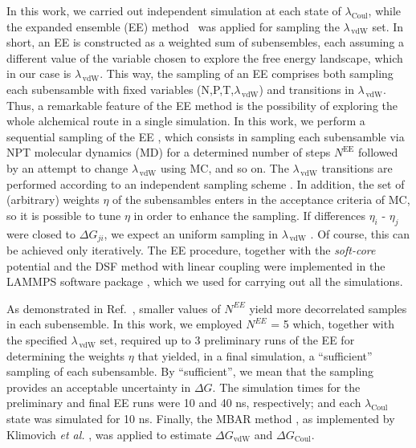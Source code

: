 \documentclass[3p,twocolumn]{elsarticle}
\begin{document}
In this work, we carried out independent simulation at each state of $\lambda_{\text{Coul}}$, while the expanded ensemble (EE) method~\cite{Lyubartsev_1992} was applied for sampling the $\lambda_{\,\text{vdW}}$ set.
In short, an EE is constructed as a weighted sum of subensembles, each assuming a different value of the variable chosen to explore the free energy landscape, which in our case is $\lambda_{\,\text{vdW}}$.
This way, the sampling of an EE comprises both sampling each subensamble with fixed variables (N,P,T,$\lambda_{\,\text{vdW}}$) and transitions in $\lambda_{\,\text{vdW}}$.
Thus, a remarkable feature of the EE method is the possibility of exploring the whole alchemical route in a single simulation.
In this work, we perform a sequential sampling of the EE \cite{Chodera_2011_2}, which consists in sampling each subensamble via NPT molecular dynamics (MD) for a determined number of steps $N^{\text{EE}}$ followed by an attempt to change $\lambda_{\,\text{vdW}}$ using MC, and so on.
The $\lambda_{\,\text{vdW}}$ transitions are performed according to an independent sampling scheme \cite{Chodera_2011_2}.
In addition, the set of (arbitrary) weights $\eta$ of the subensambles enters in the acceptance criteria of MC, so it is possible to tune $\eta$ in order to enhance the sampling.
If differences $\eta_i$ - $\eta_j$ were closed to $\Delta G_{ji}$, we expect an uniform sampling in $\lambda_{\,\text{vdW}}$ \cite{Lyubartsev_1992}.
Of course, this can be achieved only iteratively.
The EE procedure, together with the \textit{soft-core} potential and the DSF method with linear coupling were implemented in the LAMMPS software package \cite{Plimpton1995}, which we used for carrying out all the simulations.

As demonstrated in Ref.~, smaller values of $N^{EE}$ yield more decorrelated samples in each subensemble.
In this work, we employed $N^{EE}$ = 5 which, together with the specified $\lambda_{\, \text{vdW}}$ set, required up to 3 preliminary runs of the EE for determining the weights $\eta$ that yielded, in a final simulation, a ``sufficient'' sampling of each subensamble.
By ``sufficient'', we mean that the sampling provides an acceptable uncertainty in $\Delta G$.
The simulation times for the preliminary and final EE runs were 10 and 40 ns, respectively; and each $\lambda_{\text{Coul}}$ state was simulated for 10 ns.
Finally, the MBAR method \cite{Shirts_2008}, as implemented by Klimovich \textit{et al.} \cite{Klimovich_2015}, was applied to estimate $\Delta G_{\text{vdW}}$ and $\Delta G_{\text{Coul}}$.
\end{document}
